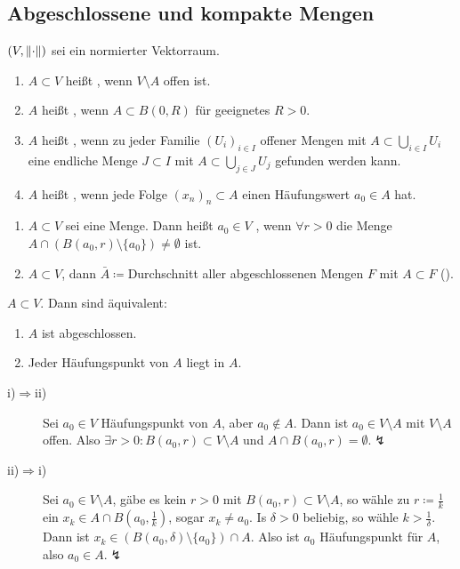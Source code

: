 \subsection{Abgeschlossene und kompakte Mengen}
$ (V,\left\|\cdot\right\|) $ sei ein normierter Vektorraum.
\begin{definition}
	\bullshit
	\begin{enumerate}
		\item $ A\subset V $ hei\ss t , wenn $ V\setminus A $ offen ist.
		\item $ A $ hei\ss t , wenn $ A\subset B(0,R) $ f\"ur geeignetes $ R>0$.
		\item $ A $ hei\ss t , wenn zu jeder Familie $ (U_i)_{i\in I} $ offener Mengen mit $ A\subset\bigcup_{i\in I} U_i $ eine endliche Menge $ J\subset I $ mit $ A\subset\bigcup_{j\in J}U_j $ gefunden werden kann.
		\item $ A $ hei\ss t , wenn jede Folge $ (x_n)_n\subset A $ einen H\"aufungswert $ a_0\in A $ hat.
	\end{enumerate}
\end{definition}
\begin{definition}
	\bullshit
	\begin{enumerate}
		\item $ A\subset V $ sei eine Menge. Dann hei\ss t $ a_0\in V $ , wenn $ \forall r>0 $ die Menge $ A\cap(B(a_0,r)\setminus\lbrace a_0\rbrace)\neq\emptyset $ ist.
		\item $ A\subset V $, dann $ \bar A\coloneqq $Durchschnitt aller abgeschlossenen Mengen $ F $ mit $ A\subset F $ ().
	\end{enumerate}
\end{definition}
\begin{lemma}
	$ A\subset V $. Dann sind \"aquivalent:
	\begin{enumerate}
		\item $ A $ ist abgeschlossen.
		\item Jeder H\"aufungspunkt von $ A $ liegt in $ A $.
	\end{enumerate}
\end{lemma}
\begin{beweis}
	\begin{description}
		\item[i)$ \Rightarrow $ii)] Sei $ a_0\in V $ H\"aufungspunkt von $ A $, aber $ a_0\notin A $. Dann ist $ a_0\in V\setminus A $ mit $ V\setminus A $ offen. Also $ \exists r>0: B(a_0,r)\subset V\setminus A $ und $ A\cap B(a_0,r)=\emptyset.\lightning $
		\item[ii)$ \Rightarrow $i)] Sei $ a_0\in V\setminus A $, g\"abe es kein $ r>0 $ mit $ B(a_0,r)\subset V\setminus A $, so w\"ahle zu $ r\coloneqq\frac{1}{k} $ ein $ x_k\in A\cap B\left(a_0,\frac{1}{k}\right) $, sogar $ x_k\neq a_0 $. Is $ \delta>0 $ beliebig, so w\"ahle $ k>\frac{1}{\delta} $. Dann ist $ x_k\in (B(a_0,\delta)\setminus\lbrace a_0\rbrace)\cap A $. Also ist $ a_0 $ H\"aufungspunkt f\"ur $ A $, also $ a_0\in A.\lightning $
	\end{description}
\end{beweis}
